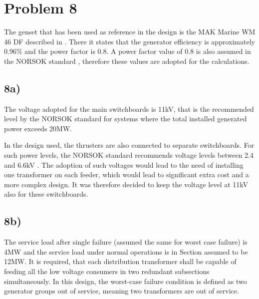 \section*{Problem 8}
The genset that has been used as reference in the design is the MAK Marine WM 46 DF described in \cite[p.128 -129]{CatGenerators}. There it states that the generator efficiency is approximately 0.96\% and the power factor is 0.8. A power factor value of 0.8 is also assumed in the NORSOK standard \cite{NORSOKstandard}, therefore these values are adopted for the calculations. 

\subsection*{8a)}
The voltage adopted for the main switchboards is 11kV, that is the recommended level by the NORSOK standard \cite[p.10]{NORSOKstandard} for systems where the total installed generated power exceeds 20MW.

In the design used, the thrusters are also connected to separate switchboards. For such power levels, the NORSOK standard recommends voltage levels between 2.4 and 6.6kV \cite{NORSOKstandard}. The adoption of such voltages would lead to the need of installing one transformer on each feeder, which would lead to significant extra cost and a more complex design. It was therefore decided to keep the voltage level at 11kV also for these switchboards. %




\subsection*{8b)}


The service load after single failure (assumed the same for worst case failure) is 4MW and the service load under normal operations is in Section  assumed to be 12MW. It is required, that each distribution transformer shall be capable of feeding all the low voltage consumers in two redundant subsections simultaneously. In this design, the worst-case failure condition is defined as two generator groups out of service, meaning two transformers are out of service. 

